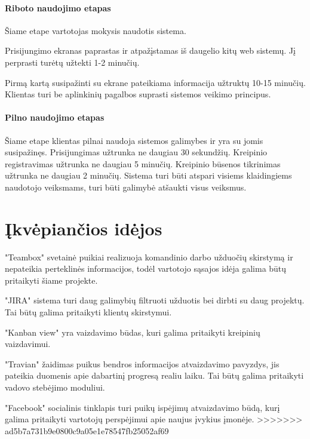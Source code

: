 			\paragraph{Riboto naudojimo etapas}
			
			Šiame etape vartotojas mokysis naudotis sistema.
			
			Prisijungimo ekranas paprastas ir atpažįstamas iš daugelio kitų web sistemų.
			Jį perprasti turėtų užtekti 1-2 minučių.

			Pirmą kartą susipažinti su ekrane pateikiama informacija užtruktų 10-15 minučių.
			Klientas turi be aplinkinių pagalbos suprasti sistemos veikimo principus.
			
			\setcounter{tocdepth}{5} \setcounter{secnumdepth}{5}
			
			\paragraph{Pilno naudojimo etapas}
			
			Šiame etape klientas pilnai naudoja sistemos galimybes ir yra su jomis susipažinęs.
			Prisijungimas užtrunka ne daugiau 30 sekundžių. Kreipinio registravimas užtrunka ne daugiau 5 minučių.
			Kreipinio būsenos tikrinimas užtrunka ne daugiau 2 minučių.
			Sistema turi būti atspari visiems klaidingiems naudotojo veiksmams, turi būti galimybė atšaukti visus veiksmus.
			
\section{Įkvėpiančios idėjos}

"Teambox" svetainė puikiai realizuoja komandinio darbo užduočių skirstymą ir nepateikia perteklinės informacijos, todėl vartotojo sąsajos idėja galima būtų pritaikyti šiame projekte.

"JIRA" sistema turi daug galimybių filtruoti užduotis bei dirbti su daug projektų. Tai būtų galima pritaikyti klientų skirstymui.

"Kanban view" yra vaizdavimo būdas, kuri galima pritaikyti kreipinių vaizdavimui.

"Travian" žaidimas puikus bendros informacijos atvaizdavimo pavyzdys, jis pateikia duomenis apie dabartinį progresą realiu laiku. Tai būtų galima pritaikyti vadovo stebėjimo moduliui.

"Facebook" socialinis tinklapis turi puikų ispėjimų atvaizdavimo būdą, kurį galima pritaikyti vartotojų perspėjimui apie naujus įvykius įmonėje.
>>>>>>> ad5b7a731b9e0800c9a05e1e78547fb25052af69

	